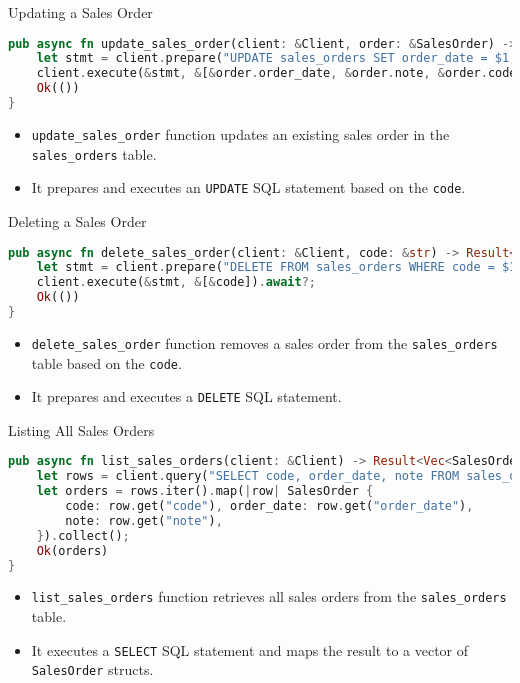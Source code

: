 \documentclass[aspectratio=169, table]{beamer}
\begin{document}
\begin{frame}[fragile]{Updating a Sales Order}
\begin{lstlisting}[language=Rust]
pub async fn update_sales_order(client: &Client, order: &SalesOrder) -> Result<(), Error> {
	let stmt = client.prepare("UPDATE sales_orders SET order_date = $1, note = $2 WHERE code = $3").await?;
	client.execute(&stmt, &[&order.order_date, &order.note, &order.code]).await?;
	Ok(())
}
\end{lstlisting}

\begin{itemize}
\item \texttt{update\_sales\_order} function updates an existing sales order in the \texttt{sales\_orders} table.
\item It prepares and executes an \texttt{UPDATE} SQL statement based on the \texttt{code}.
\end{itemize}
\end{frame}


\begin{frame}[fragile]{Deleting a Sales Order}
\begin{lstlisting}[language=Rust]
pub async fn delete_sales_order(client: &Client, code: &str) -> Result<(), Error> {
	let stmt = client.prepare("DELETE FROM sales_orders WHERE code = $1").await?;
	client.execute(&stmt, &[&code]).await?;
	Ok(())
}
\end{lstlisting}

\begin{itemize}
\item \texttt{delete\_sales\_order} function removes a sales order from the \texttt{sales\_orders} table based on the \texttt{code}.
\item It prepares and executes a \texttt{DELETE} SQL statement.
\end{itemize}
\end{frame}

\begin{frame}[fragile]{Listing All Sales Orders}
\vspace{15pt}
\begin{lstlisting}[language=Rust]
pub async fn list_sales_orders(client: &Client) -> Result<Vec<SalesOrder>, Error> {
	let rows = client.query("SELECT code, order_date, note FROM sales_orders ORDER BY code", &[]).await?;
	let orders = rows.iter().map(|row| SalesOrder {
		code: row.get("code"), order_date: row.get("order_date"), 
		note: row.get("note"),
	}).collect();
	Ok(orders)
}
\end{lstlisting}

\begin{itemize}
\item \texttt{list\_sales\_orders} function retrieves all sales orders from the \texttt{sales\_orders} table.
\item It executes a \texttt{SELECT} SQL statement and maps the result to a vector of \texttt{SalesOrder} structs.
\end{itemize}
\end{frame}
\end{document}
